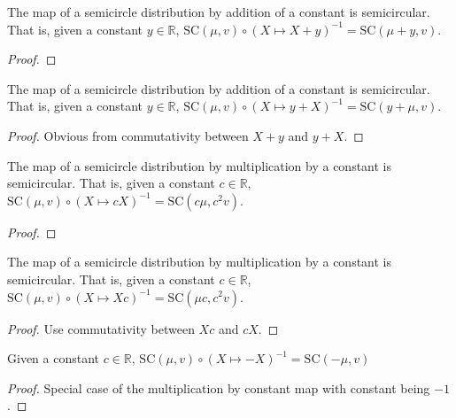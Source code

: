 

\begin{lemma}\label{lem:semicircleReal_map_add_const}
  \notready
  The map of a semicircle distribution by addition of a constant is semicircular. That is,
  given a constant $y \in \mathbb{R}$, $ \mathrm{SC}(\mu, v) \circ (X \mapsto X + y )^{-1} = \mathrm{SC}(\mu + y, v)$.
  \begin{proof}
  \end{proof}
\end{lemma}

\begin{lemma}\label{lem:semicircleReal_map_const_add}
  \mathlibok
  The map of a semicircle distribution by addition of a constant is semicircular. That is,
  given a constant $y \in \mathbb{R}$, $ \mathrm{SC}(\mu, v) \circ (X \mapsto y + X )^{-1} = \mathrm{SC}(y + \mu, v)$.
  \begin{proof}
    Obvious from commutativity between $X + y$ and $y + X$.
  \end{proof}
\end{lemma}

\begin{lemma}\label{lem:semicircleReal_map_const_mul}
  \notready
    The map of a semicircle distribution by multiplication by a constant is semicircular. That is,
  given a constant $c \in \mathbb{R}$, $ \mathrm{SC}(\mu, v) \circ (X \mapsto cX )^{-1} = \mathrm{SC}(c\mu , c^2v)$.
  \begin{proof}
  \end{proof}
\end{lemma}

\begin{lemma}\label{lem:semicircleReal_map_mul_const}
  \mathlibok
   The map of a semicircle distribution by multiplication by a constant is semicircular. That is,
  given a constant $c \in \mathbb{R}$, $ \mathrm{SC}(\mu, v) \circ (X \mapsto Xc )^{-1} = \mathrm{SC}(\mu c , c^2v)$.
  \begin{proof}
    Use commutativity between $Xc$ and $cX$.
  \end{proof}
\end{lemma}

\begin{lemma}\label{lem:semicircleReal_map_neg}
  \mathlibok
  Given a constant $c \in \mathbb{R}$, $ \mathrm{SC}(\mu, v) \circ (X \mapsto -X )^{-1} = \mathrm{SC}(-\mu  , v)$
  \begin{proof}
     Special case of the multiplication by constant map with constant being $-1$.
  \end{proof}
\end{lemma}

